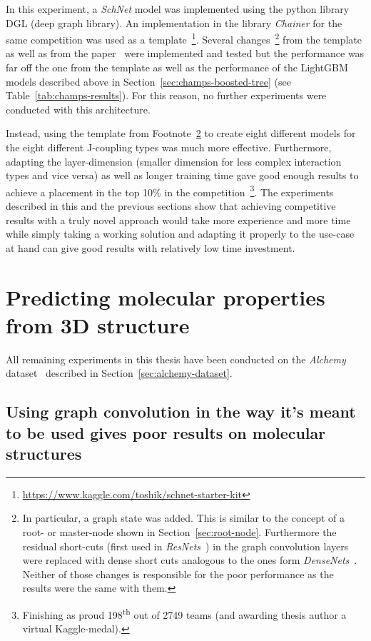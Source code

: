 In this experiment, a \textit{SchNet} model was implemented using the python library DGL (deep graph library). An implementation in the library \textit{Chainer} for the same competition was used as a template~\footnote{\url{https://www.kaggle.com/toshik/schnet-starter-kit}}. Several changes~\footnote{\label{fn:chainer-schnet}
	In particular, a graph state was added. This is similar to the concept of a root- or master-node shown in Section~\ref{sec:root-node}. Furthermore the residual short-cuts (first used in \textit{ResNets}~\cite{Sun2016}) in the graph convolution layers were replaced with dense short cuts analogous to the ones form \textit{DenseNets}~\cite{Huang2017}. Neither of those changes is responsible for the poor performance as the results were the same with them.
} from the template as well as from the paper~\cite{Schutt2017} were implemented and tested but the performance was far off the one from the template as well as the performance of the LightGBM models described above in Section~\ref{sec:champs-boosted-tree} (see Table~\ref{tab:champs-results}). For this reason, no further experiments were conducted with this architecture.

Instead, using the template from Footnote~\ref{fn:chainer-schnet} to create eight different models for the eight different J-coupling types was much more effective. Furthermore, adapting the layer-dimension (smaller dimension for less complex interaction types and vice versa) as well as longer training time gave good enough results to achieve a placement in the top 10\% in the competition~\footnote{Finishing as proud 198\textsuperscript{th} out of 2749 teams (and awarding thesis author a virtual Kaggle-medal).}. The experiments described in this and the previous sections show that achieving competitive results with a truly novel approach would take more experience and more time while simply taking a working solution and adapting it properly to the use-case at hand can give good results with relatively low time investment.


\section{Predicting molecular properties from 3D structure}
\label{sec:alchemy}

All remaining experiments in this thesis have been conducted on the \textit{Alchemy} dataset~\cite{Chen2019} described in Section~\ref{sec:alchemy-dataset}.

\subsection{Using graph convolution in the way it's meant to be used gives poor results on molecular structures}
\label{sec:neighborhood-expansion}

